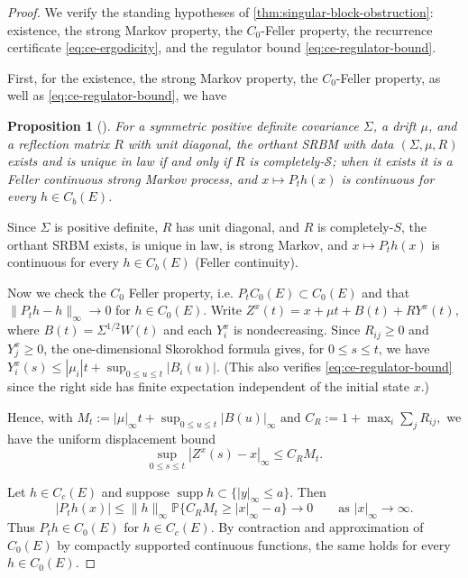 \documentclass[aihp]{imsart}
\numberwithin{equation}{section}
\theoremstyle{plain}
\newtheorem{proposition}[proposition]{Proposition}
\theoremstyle{definition}
\newcommand{\1}{\mathbf 1}
\begin{document}
\begin{proof}
We verify the standing hypotheses of \cref{thm:singular-block-obstruction}: existence, the strong Markov property, the \(C_0\)-Feller property, the recurrence certificate \eqref{eq:ce-ergodicity}, and the regulator bound \eqref{eq:ce-regulator-bound}.

First, for the existence, the strong Markov property, the \(C_0\)-Feller property, as well as \eqref{eq:ce-regulator-bound}, we have
\begin{proposition}[{\normalfont\cite{TaylorWilliams1993}}]
    For a symmetric positive definite covariance $\Sigma$, a drift $\mu$, and a reflection matrix $R$ with unit diagonal, the orthant SRBM with data $(\Sigma,\mu,R)$ exists and is unique in law if and only if $R$ is completely-$\mathcal S$; when it exists it is a Feller continuous strong Markov process, and $x\mapsto P_t h(x)$ is continuous for every $h\in C_b(E)$. 
\end{proposition}

Since $\Sigma$ is positive definite, $R$ has unit diagonal, and
$R$ is completely-$S$, the orthant SRBM exists, is unique in law, is strong Markov,
and $x\mapsto P_t h(x)$ is continuous for every $h\in C_b(E)$ (Feller continuity).

Now we check the $C_0$ Feller property, i.e. $P_tC_0(E)\subset C_0(E)$ and that
$\|P_t h-h\|_\infty\to0$ for $h\in C_0(E)$. Write $Z^x(t)=x+\mu t+B(t)+RY^x(t),$ where $B(t)=\Sigma^{1/2}W(t)$ and each $Y_i^x$ is nondecreasing. Since $R_{ij}\ge0$ and $Y_j^x\ge0$, the one-dimensional Skorokhod formula gives, for
$0\le s\le t$, we have $Y_i^x(s)
        \le
        |\mu_i|t+\sup_{0\le u\le t}|B_i(u)|.$ (This also verifies \eqref{eq:ce-regulator-bound} since the right side has finite expectation independent of the initial state $x$.) 
        
Hence, with $M_t:=|\mu|_\infty t+\sup_{0\le u\le t}|B(u)|_\infty \text{ and }
        C_R:=1+\max_i\sum_j R_{ij},$ we have the uniform displacement bound
\[
        \sup_{0\le s\le t}|Z^x(s)-x|_\infty \le C_R M_t .
\]

Let $h\in C_c(E)$ and suppose $\operatorname{supp}h\subset\{|y|_\infty\le a\}$.
Then
\[
        |P_t h(x)|
        \le
        \|h\|_\infty
        \mathbb P\{C_RM_t\ge |x|_\infty-a\}
        \longrightarrow 0
        \qquad\text{as } |x|_\infty\to\infty .
\]
Thus $P_t h\in C_0(E)$ for $h\in C_c(E)$. By contraction and approximation of
$C_0(E)$ by compactly supported continuous functions, the same holds for every
$h\in C_0(E)$.


\end{proof}
\end{document}
